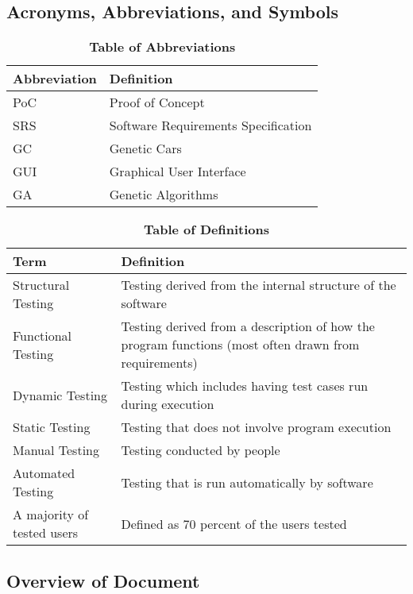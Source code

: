 \documentclass[12pt, titlepage]{article}
\begin{document}
\subsection{Acronyms, Abbreviations, and Symbols}
	
\begin{table}[hbp]
\caption{\textbf{Table of Abbreviations}} \label{Table}

\begin{tabularx}{\textwidth}{p{3cm}X}
\toprule
\textbf{Abbreviation} & \textbf{Definition} \\
\midrule
PoC & Proof of Concept\\
SRS & Software Requirements Specification\\
GC & Genetic Cars\\
GUI & Graphical User Interface\\
GA & Genetic Algorithms\\
\bottomrule
\end{tabularx}

\end{table}

\begin{table}[!htbp]
\caption{\textbf{Table of Definitions}} \label{Table}

\begin{tabularx}{\textwidth}{p{3cm}X}
\toprule
\textbf{Term} & \textbf{Definition}\\
\midrule
Structural Testing & Testing derived from the internal structure of the 
software\\
Functional Testing & Testing derived from a description of how the program 
functions (most often drawn from requirements)\\
Dynamic Testing & Testing which includes having test cases run during 
execution\\
Static Testing & Testing that does not involve program execution\\
Manual Testing & Testing conducted by people\\
Automated Testing & Testing that is run automatically by software\\
A majority of tested users & Defined as 70 percent of the users tested\\
\bottomrule
\end{tabularx}

\end{table}	

\subsection{Overview of Document}
\end{document}
